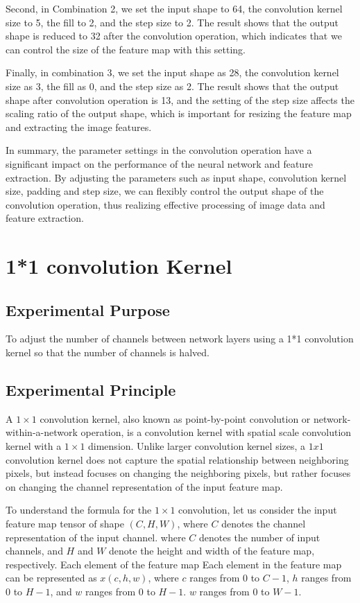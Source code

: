 \documentclass[a4paper,12pt]{article}
\begin{document}
Second, in Combination 2, we set the input shape to 64, the convolution kernel size to 5, the fill to 2, and the step size to 2. The result shows that the output shape is reduced to 32 after the convolution operation, which indicates that we can control the size of the feature map with this setting.

Finally, in combination 3, we set the input shape as 28, the convolution kernel size as 3, the fill as 0, and the step size as 2. The result shows that the output shape after convolution operation is 13, and the setting of the step size affects the scaling ratio of the output shape, which is important for resizing the feature map and extracting the image features.

In summary, the parameter settings in the convolution operation have a significant impact on the performance of the neural network and feature extraction. By adjusting the parameters such as input shape, convolution kernel size, padding and step size, we can flexibly control the output shape of the convolution operation, thus realizing effective processing of image data and feature extraction.

\newpage
\section{1*1 convolution Kernel}
\subsection{Experimental Purpose}
To adjust the number of channels between network layers using a 1*1 convolution kernel so that the number of channels is halved.

\subsection{Experimental Principle}
A $1 \times 1$ convolution kernel, also known as point-by-point convolution or network-within-a-network operation, is a convolution kernel with spatial scale
convolution kernel with a $1 \times 1$ dimension. Unlike larger convolution kernel sizes, a $1x1$ convolution kernel does not capture the spatial relationship between neighboring pixels, but instead focuses on changing the
neighboring pixels, but rather focuses on changing the channel representation of the input feature map.

To understand the formula for the $1 \times 1$ convolution, let us consider the input feature map tensor of shape $(C, H, W)$, where $C $ denotes the channel representation of the input channel.
where $C $ denotes the number of input channels, and $H $ and $W $ denote the height and width of the feature map, respectively. Each element of the feature map
Each element in the feature map can be represented as $x(c, h, w)$, where $c $ ranges from $0$ to $C-1$, $h $ ranges from $0$ to $H-1$, and $w $ ranges from $0$ to $H-1$.
$w $ ranges from $0 $ to $W-1$.
\end{document}
